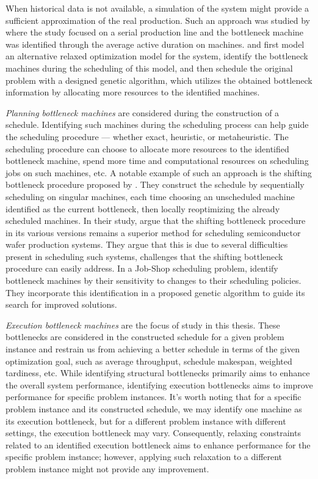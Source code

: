 When historical data is not available,
a simulation of the system might provide a sufficient approximation of the real production.
Such an approach was studied by \citet{Roser2001} where the study focused on a serial production line
and the bottleneck machine was identified through the average active duration on machines.
\citet{Zhang2008a} and \citet{Zhang2012} first model an alternative relaxed optimization model for the system,
identify the bottleneck machines during the scheduling of this model,
and then schedule the original problem with a designed genetic algorithm,
which utilizes the obtained bottleneck information by allocating more resources to the identified machines.

\emph{Planning bottleneck machines} are considered during the construction of a schedule.
Identifying such machines during the scheduling process can help guide the scheduling procedure
--- whether exact, heuristic, or metaheuristic.
The scheduling procedure can choose to allocate more resources to the identified bottleneck machine,
spend more time and computational resources on scheduling jobs on such machines, etc.
A notable example of such an approach is the shifting bottleneck procedure proposed by \citet{Adams1988}.
They construct the schedule by sequentially scheduling on singular machines,
each time choosing an unscheduled machine identified as the current bottleneck,
then locally reoptimizing the already scheduled machines.
In their study, \citet{Mnch2010} argue that the shifting bottleneck procedure in its various versions
remains a superior method for scheduling semiconductor wafer production systems.
They argue that this is due to several difficulties present in scheduling such systems,
challenges that the shifting bottleneck procedure can easily address.
In a Job-Shop scheduling problem,
\citet{Zhang2008b} identify bottleneck machines by their sensitivity to changes to their scheduling policies.
They incorporate this identification in a proposed genetic algorithm to guide its search for improved solutions.

\emph{Execution bottleneck machines} are the focus of study in this thesis.
These bottlenecks are considered in the constructed schedule for a given problem instance
and restrain us from achieving a better schedule in terms of the given optimization goal,
such as average throughput, schedule makespan, weighted tardiness, etc.
While identifying structural bottlenecks primarily aims to enhance the overall system performance,
identifying execution bottlenecks aims to improve performance for specific problem instances.
It's worth noting that for a specific problem instance and its constructed schedule,
we may identify one machine as its execution bottleneck,
but for a different problem instance with different settings,
the execution bottleneck may vary.
Consequently, relaxing constraints related to an identified execution bottleneck
aims to enhance performance for the specific problem instance;
however, applying such relaxation to a different problem instance might not provide any improvement.

